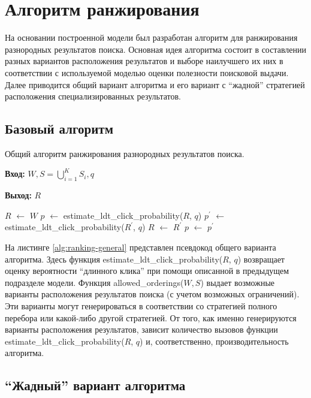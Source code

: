 \documentclass[12pt,a4paper]{report}
\makeatletter
\newenvironment{myalgorithm}[1][htb]{%
    \renewcommand{\ALG@name}{Алгоритм}%
   \begin{algorithm}[#1]%
  }{\end{algorithm}}
\newcommand*\Let[2]{\State #1 $\gets$ #2}
\makeatother
\begin{document}
\section{Алгоритм ранжирования}

На основании построенной модели был разработан алгоритм для ранжирования разнородных результатов поиска. Основная идея алгоритма состоит в составлении разных вариантов расположения результатов и выборе наилучшего их них в соответствии с используемой моделью оценки полезности поисковой выдачи. Далее приводится общий вариант алгоритма и его вариант с ``жадной'' стратегией расположения специализированных результатов.

\subsection{Базовый алгоритм}

\begin{myalgorithm}[t!]
\caption{Общий алгоритм ранжирования разнородных результатов поиска.}
\label{alg:ranking-general}
\textbf{Вход:} $W, S=\bigcup\limits_{i=1}^{K} S_i, q$ \par
\textbf{Выход:} $R$
\begin{algorithmic}[1]
    \Let{$R$}{$W$}
    \Let{$p$}{estimate\_ldt\_click\_probability($R$, $q$)}
      \Let{$p^{'}$}{estimate\_ldt\_click\_probability($R^{'}$, $q$)}
        \Let{$R$}{$R^{'}$}
        \Let{$p$}{$p^{'}$}
      \EndIf
    \EndFor
\EndFunction
\end{algorithmic}
\end{myalgorithm}

На листинге \ref{alg:ranking-general} представлен псевдокод общего варианта алгоритма.
Здесь функция \textrm{estimate\_ldt\_click\_probability($R$, $q$)} возвращает оценку вероятности ``длинного клика'' при помощи описанной в предыдущем подразделе модели. Функция \linebreak \textrm{allowed\_orderings($W, S$)} выдает возможные варианты расположения результатов поиска (с учетом возможных ограничений). Эти варианты могут генерироваться в соответствии со стратегией полного перебора или какой-либо другой стратегией. От того, как именно генерируются варианты расположения результатов, зависит количество вызовов функции  \textrm{estimate\_ldt\_click\_probability($R$, $q$)} и, соответственно, производительность алгоритма.

\subsection{``Жадный'' вариант алгоритма}
\end{document}
